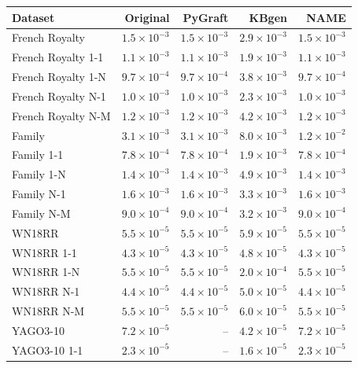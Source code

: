 \begin{tabular}{lrrrr}
\toprule
Dataset & Original & PyGraft & KBgen & NAME \\
\midrule
French Royalty & $1.5\times10^{-3}$ & $1.5\times10^{-3}$ & $2.9\times10^{-3}$ & $1.5\times10^{-3}$ \\
French Royalty 1-1 & $1.1\times10^{-3}$ & $1.1\times10^{-3}$ & $1.9\times10^{-3}$ & $1.1\times10^{-3}$ \\
French Royalty 1-N & $9.7\times10^{-4}$ & $9.7\times10^{-4}$ & $3.8\times10^{-3}$ & $9.7\times10^{-4}$ \\
French Royalty N-1 & $1.0\times10^{-3}$ & $1.0\times10^{-3}$ & $2.3\times10^{-3}$ & $1.0\times10^{-3}$ \\
French Royalty N-M & $1.2\times10^{-3}$ & $1.2\times10^{-3}$ & $4.2\times10^{-3}$ & $1.2\times10^{-3}$ \\
\midrule
Family & $3.1\times10^{-3}$ & $3.1\times10^{-3}$ & $8.0\times10^{-3}$ & $1.2\times10^{-2}$ \\
Family 1-1 & $7.8\times10^{-4}$ & $7.8\times10^{-4}$ & $1.9\times10^{-3}$ & $7.8\times10^{-4}$ \\
Family 1-N & $1.4\times10^{-3}$ & $1.4\times10^{-3}$ & $4.9\times10^{-3}$ & $1.4\times10^{-3}$ \\
Family N-1 & $1.6\times10^{-3}$ & $1.6\times10^{-3}$ & $3.3\times10^{-3}$ & $1.6\times10^{-3}$ \\
Family N-M & $9.0\times10^{-4}$ & $9.0\times10^{-4}$ & $3.2\times10^{-3}$ & $9.0\times10^{-4}$ \\
\midrule
WN18RR & $5.5\times10^{-5}$ & $5.5\times10^{-5}$ & $5.9\times10^{-5}$ & $5.5\times10^{-5}$ \\
WN18RR 1-1 & $4.3\times10^{-5}$ & $4.3\times10^{-5}$ & $4.8\times10^{-5}$ & $4.3\times10^{-5}$ \\
WN18RR 1-N & $5.5\times10^{-5}$ & $5.5\times10^{-5}$ & $2.0\times10^{-4}$ & $5.5\times10^{-5}$ \\
WN18RR N-1 & $4.4\times10^{-5}$ & $4.4\times10^{-5}$ & $5.0\times10^{-5}$ & $4.4\times10^{-5}$ \\
WN18RR N-M & $5.5\times10^{-5}$ & $5.5\times10^{-5}$ & $6.0\times10^{-5}$ & $5.5\times10^{-5}$ \\
\midrule
YAGO3-10 & $7.2\times10^{-5}$ & – & $4.2\times10^{-5}$ & $7.2\times10^{-5}$ \\
YAGO3-10 1-1 & $2.3\times10^{-5}$ & – & $1.6\times10^{-5}$ & $2.3\times10^{-5}$ \\

\end{tabular}
